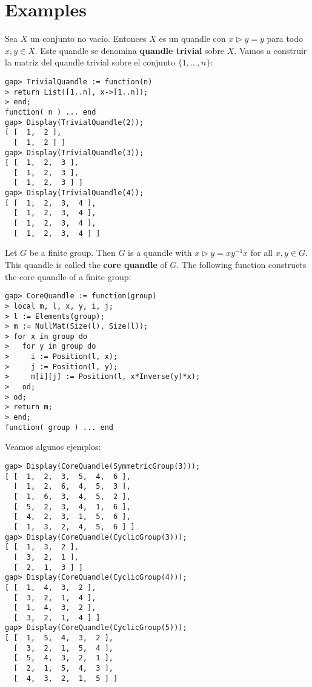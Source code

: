 \section{Examples}

\begin{block}
 Sea $X$ un conjunto no vacío. Entonces $X$ es un
quandle con $x\triangleright y=y$ para todo $x,y\in X$. Este quandle se
denomina \textbf{quandle trivial} sobre $X$. Vamos a construir la matriz 
del quandle trivial sobre el conjunto $\{1,\dots,n\}$: 
\begin{lstlisting}
gap> TrivialQuandle := function(n)
> return List([1..n], x->[1..n]);
> end;
function( n ) ... end
gap> Display(TrivialQuandle(2));
[ [  1,  2 ],
  [  1,  2 ] ]
gap> Display(TrivialQuandle(3));
[ [  1,  2,  3 ],
  [  1,  2,  3 ],
  [  1,  2,  3 ] ]
gap> Display(TrivialQuandle(4));
[ [  1,  2,  3,  4 ],
  [  1,  2,  3,  4 ],
  [  1,  2,  3,  4 ],
  [  1,  2,  3,  4 ] ]
\end{lstlisting}
\end{block}


\begin{block}
Let $G$ be a finite group. Then $G$ is a quandle with $x\triangleright
y=xy^{-1}x$ for all $x,y\in G$.  This quandle is called the \textbf{core
quandle} of $G$.  The following function constructs the core quandle of a
finite group:
\begin{lstlisting}
gap> CoreQuandle := function(group)
> local m, l, x, y, i, j;
> l := Elements(group);
> m := NullMat(Size(l), Size(l));
> for x in group do
>   for y in group do
>     i := Position(l, x);
>     j := Position(l, y);
>     m[i][j] := Position(l, x*Inverse(y)*x);
>   od;
> od;
> return m;
> end;
function( group ) ... end
\end{lstlisting}
Veamos algunos ejemplos:
\begin{lstlisting}
gap> Display(CoreQuandle(SymmetricGroup(3)));
[ [  1,  2,  3,  5,  4,  6 ],
  [  1,  2,  6,  4,  5,  3 ],
  [  1,  6,  3,  4,  5,  2 ],
  [  5,  2,  3,  4,  1,  6 ],
  [  4,  2,  3,  1,  5,  6 ],
  [  1,  3,  2,  4,  5,  6 ] ]
gap> Display(CoreQuandle(CyclicGroup(3)));
[ [  1,  3,  2 ],
  [  3,  2,  1 ],
  [  2,  1,  3 ] ]
gap> Display(CoreQuandle(CyclicGroup(4)));
[ [  1,  4,  3,  2 ],
  [  3,  2,  1,  4 ],
  [  1,  4,  3,  2 ],
  [  3,  2,  1,  4 ] ]
gap> Display(CoreQuandle(CyclicGroup(5)));
[ [  1,  5,  4,  3,  2 ],
  [  3,  2,  1,  5,  4 ],
  [  5,  4,  3,  2,  1 ],
  [  2,  1,  5,  4,  3 ],
  [  4,  3,  2,  1,  5 ] ]
\end{lstlisting}
\end{block}

